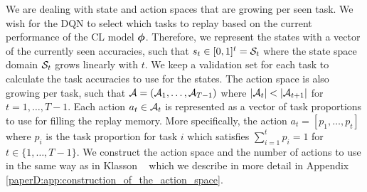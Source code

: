 
We are dealing with state and action spaces that are growing per seen task. We wish for the DQN to select which tasks to replay based on the current performance of the CL model ${\bm{\phi}}$. Therefore, we represent the states with a vector of the currently seen accuracies, such that $s_t \in [0, 1]^{t} = {\mathcal{S}}_t$ where the state space domain ${\mathcal{S}}_t$ grows linearly with $t$. We keep a validation set for each task to calculate the task accuracies to use for the states. The action space is also growing per task, such that ${\mathcal{A}} = ({\mathcal{A}}_1, \dots, {\mathcal{A}}_{T-1})$ where $|{\mathcal{A}}_t| < |{\mathcal{A}}_{t+1}|$ for $t=1, \dots, T-1$. Each action $a_t \in {\mathcal{A}}_t$ is represented as a vector of task proportions to use for filling the replay memory. More specifically, the action $a_t = [p_1, \dots, p_{t}]$ where $p_i$ is the task proportion for task $i$ which satisfies $\sum_{i=1}^{t} p_i = 1$ for $t \in \{1, \dots, T-1\}$.  We construct the action space and the number of actions to use in the same way as in Klasson \etal~ which we describe in more detail in Appendix \ref{paperD:app:construction_of_the_action_space}.   




